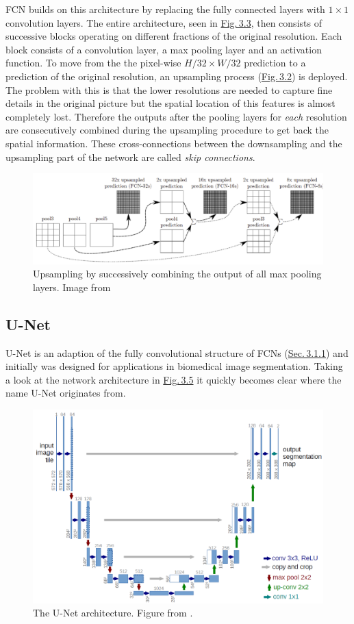 FCN builds on this architecture by replacing the fully connected layers with $1\times1$ convolution layers. The entire architecture, seen in \hyperref[fig:3.3]{Fig.\,3.3}, then consists of successive blocks operating on different fractions of the original resolution. Each block consists of a convolution layer, a max pooling layer and an activation function. To move from the the pixel-wise $H/32\times W/32$ prediction to a prediction of the original resolution, an upsampling process (\hyperref[fig:3.4]{Fig.\,3.2}) is deployed. The problem with this is that the lower resolutions are needed to capture fine details in the original picture but the spatial location of this features is almost completely lost. Therefore the outputs after the pooling layers for \textit{each} resolution are consecutively combined during the upsampling procedure to get back the spatial information. These cross-connections between the downsampling and the upsampling part of the network are called \textit{skip connections}.

%
\begin{figure} \label{fig:3.4}
    \centering
    \includegraphics[width=.65\textwidth]{Chapters/figures/fcn2.PNG}
    \caption[FCN upsampling process]{Upsampling by successively combining the output of all max pooling layers. Image from \cite{fcn}}
\end{figure}
%
\subsection{U-Net} \label{sec:3.1.2}
U-Net \cite{unet} is an adaption of the fully convolutional structure of FCNs (\hyperref[sec:3.1.1]{Sec.\,3.1.1}) and initially was designed for applications in biomedical image segmentation. Taking a look at the network architecture in \hyperref[fig:3.5]{Fig.\,3.5} it quickly becomes clear where the name U-Net originates from.
%
\begin{figure}[h!] \label{fig:3.5}
    \centering
    \includegraphics[width=.70\textwidth]{Chapters/figures/unet.PNG}
    \caption[The U-Net architecture]{The U-Net architecture. Figure from \cite{unet}.}
\end{figure}
%

